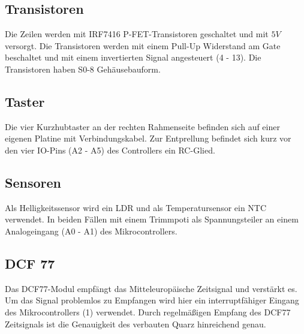 \begin{multicols}{2}
\subsection{Transistoren}
Die Zeilen werden mit IRF7416 P-FET-Transistoren geschaltet und mit $5V$ versorgt. Die Transistoren werden mit einem Pull-Up Widerstand am Gate beschaltet und mit einem invertierten Signal angesteuert (4 - 13). Die Transistoren haben S0-8 Gehäusebauform. 
\subsection{Taster}
Die vier Kurzhubtaster an der rechten Rahmenseite befinden sich auf einer eigenen Platine mit Verbindungskabel. Zur Entprellung befindet sich kurz vor den vier IO-Pins (A2 - A5) des Controllers ein RC-Glied. 
\subsection{Sensoren}
Als Helligkeitssensor wird ein LDR und als Temperatursensor ein NTC verwendet. In beiden Fällen mit einem Trimmpoti als Spannungsteiler an einem Analogeingang (A0 - A1) des Mikrocontrollers.
\subsection{DCF 77}
Das DCF77-Modul empfängt das Mitteleuropäische Zeitsignal und verstärkt es. Um das Signal problemlos zu Empfangen wird hier ein interruptfähiger Eingang des Mikrocontrollers (1) verwendet. Durch regelmäßigen Empfang des DCF77 Zeitsignals ist die Genauigkeit des verbauten Quarz hinreichend genau.

\end{multicols}